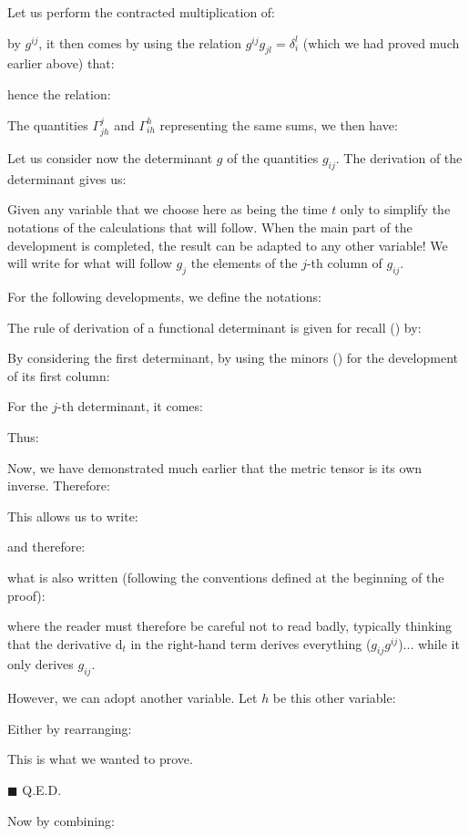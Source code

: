 	Let us perform the contracted multiplication of:
	
	by $g^{ij}$, it then comes by using the relation $g^{ij}g_{jl}=\delta_i^l$ (which we had proved much earlier above) that:
	
	hence the relation:
	
	The quantities $\Gamma_{jh}^j$ and $\Gamma_{ih}^h$ representing the same sums, we then have:
	
	\begin{theorem}
	Let us consider now the determinant $g$ of the quantities $g_{ij}$. The derivation of the determinant gives us:
	
	\end{theorem}
	\begin{dem}
	Given any variable that we choose here as being the time $t$ only to simplify the notations of the calculations that will follow. When the main part of the development is completed, the result can be adapted to any other variable! We will write for what will follow $g_j$ the elements of the $j$-th column of $g_{ij}$.

	For the following developments, we define the notations:
	
	The rule of derivation of a functional determinant is given for recall () by:
	
	By considering the first determinant, by using the minors () for the development of its first column:
	
	For the $j$-th determinant, it comes:
	
	Thus:
	
	Now, we have demonstrated much earlier that the metric tensor is its own inverse. Therefore:
	
	This allows us to write:
	
	and therefore:
	
	what is also written (following the conventions defined at the beginning of the proof):
	
	where the reader must therefore be careful not to read badly, typically thinking that the derivative $\mathrm{d}_t$ in the right-hand term derives everything ($g_{ij}g^{ij}$)... while it only derives $g_{ij}$.
	
	However, we can adopt another variable. Let $h$ be this other variable:
	
	Either by rearranging:
	
	This is what we wanted to prove.
	\begin{flushright}
		$\blacksquare$  Q.E.D.
	\end{flushright}
	\end{dem}
	Now by combining:
	
